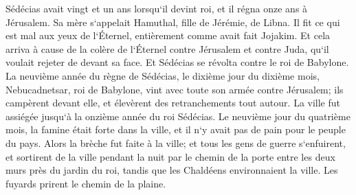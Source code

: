 \verse Sédécias avait vingt et un ans lorsqu`il devint roi, et il régna onze ans à Jérusalem. Sa mère s`appelait Hamuthal, fille de Jérémie, de Libna. 
\verse Il fit ce qui est mal aux yeux de l`Éternel, entièrement comme avait fait Jojakim. 
\verse Et cela arriva à cause de la colère de l`Éternel contre Jérusalem et contre Juda, qu`il voulait rejeter de devant sa face. Et Sédécias se révolta contre le roi de Babylone. 
\verse La neuvième année du règne de Sédécias, le dixième jour du dixième mois, Nebucadnetsar, roi de Babylone, vint avec toute son armée contre Jérusalem; ils campèrent devant elle, et élevèrent des retranchements tout autour. 
\verse La ville fut assiégée jusqu`à la onzième année du roi Sédécias. 
\verse Le neuvième jour du quatrième mois, la famine était forte dans la ville, et il n`y avait pas de pain pour le peuple du pays. 
\verse Alors la brèche fut faite à la ville; et tous les gens de guerre s`enfuirent, et sortirent de la ville pendant la nuit par le chemin de la porte entre les deux murs près du jardin du roi, tandis que les Chaldéens environnaient la ville. Les fuyards prirent le chemin de la plaine. 

